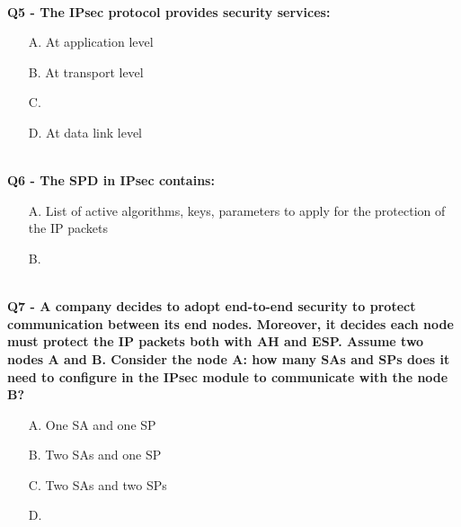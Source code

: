 \textbf{\\Q5 - The IPsec protocol provides security services:}
\begin{itemize}
    \item[A.] At application level
    \item[B.] At transport level
    \item[C.] 
    \item[D.] At data link level
\end{itemize}

\textbf{\\Q6 - The SPD in IPsec contains:}
\begin{itemize}
    \item[A.] List of active algorithms, keys, parameters to apply for the protection of the IP packets
    \item[B.] 
\end{itemize}

\textbf{\\Q7 - A company decides to adopt end-to-end security to protect communication between its end nodes. Moreover, it decides each node must protect the IP packets both with AH and ESP. Assume two nodes A and B. Consider the node A: how many SAs and SPs does it need to configure in the IPsec module to communicate with the node B?}
\begin{itemize}
    \item[A.] One SA and one SP
    \item[B.] Two SAs and one SP
    \item[C.] Two SAs and two SPs
    \item[D.] 
\end{itemize}

